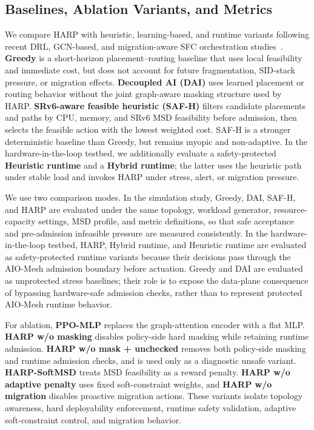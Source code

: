 \documentclass[final,5p]{elsarticle}
\begin{document}
\subsection{Baselines, Ablation Variants, and Metrics}
\label{subsec:baselines_metrics}
We compare HARP with heuristic, learning-based, and runtime variants following recent DRL, GCN-based, and migration-aware SFC orchestration studies~\cite{xiao2023twostage,liu2024sfcml,addad2022ai,tariq2023fipam,afrasiabi2024cluster}. \textbf{Greedy} is a short-horizon placement--routing baseline that uses local feasibility and immediate cost, but does not account for future fragmentation, SID-stack pressure, or migration effects. \textbf{Decoupled AI (DAI)} uses learned placement or routing behavior without the joint graph-aware masking structure used by HARP. \textbf{SRv6-aware feasible heuristic (SAF-H)} filters candidate placements and paths by CPU, memory, and SRv6 MSD feasibility before admission, then selects the feasible action with the lowest weighted cost. SAF-H is a stronger deterministic baseline than Greedy, but remains myopic and non-adaptive. In the hardware-in-the-loop testbed, we additionally evaluate a safety-protected \textbf{Heuristic runtime} and a \textbf{Hybrid runtime}; the latter uses the heuristic path under stable load and invokes HARP under stress, alert, or migration pressure.

We use two comparison modes. In the simulation study, Greedy, DAI, SAF-H, and HARP are evaluated under the same topology, workload generator, resource-capacity settings, MSD profile, and metric definitions, so that safe acceptance and pre-admission infeasible pressure are measured consistently. In the hardware-in-the-loop testbed, HARP, Hybrid runtime, and Heuristic runtime are evaluated as safety-protected runtime variants because their decisions pass through the AIO-Mesh admission boundary before actuation. Greedy and DAI are evaluated as unprotected stress baselines; their role is to expose the data-plane consequence of bypassing hardware-safe admission checks, rather than to represent protected AIO-Mesh runtime behavior.

For ablation, \textbf{PPO-MLP} replaces the graph-attention encoder with a flat MLP. \textbf{HARP w/o masking} disables policy-side hard masking while retaining runtime admission. \textbf{HARP w/o mask + unchecked} removes both policy-side masking and runtime admission checks, and is used only as a diagnostic unsafe variant. \textbf{HARP-SoftMSD} treats MSD feasibility as a reward penalty. \textbf{HARP w/o adaptive penalty} uses fixed soft-constraint weights, and \textbf{HARP w/o migration} disables proactive migration actions. These variants isolate topology awareness, hard deployability enforcement, runtime safety validation, adaptive soft-constraint control, and migration behavior.
\end{document}
